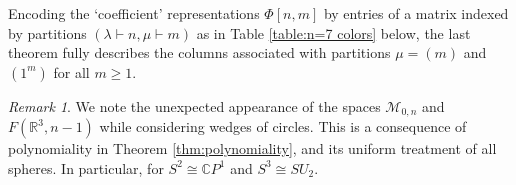 \documentclass[12pt]{article}
\newcommand{\R}{\mathbb{R}}
\newcommand{\ModuliCurve}[1]{\mathcal{M}_{#1}}
\DeclareMathOperator{\Out}{Out}
\theoremstyle{plain}
\theoremstyle{definition}
\theoremstyle{remark}
\newtheorem{rmk}[thm]{Remark}
\begin{document}
Encoding the `coefficient' representations $\Phi[n,m]$ by entries of a matrix indexed by partitions $(\lambda\vdash n, \mu \vdash m)$ as in Table \ref{table:n=7 colors} below, the last theorem fully describes the columns associated with partitions $\mu = (m)$ and $(1^m)$ for all $m\geq 1$.

\begin{rmk}
    We note the unexpected appearance of the spaces $\ModuliCurve{0,n}$ and $F(\R^3,n-1)$ while considering wedges of circles. This is a consequence of polynomiality in Theorem \ref{thm:polynomiality}, and its uniform treatment of all spheres. In particular, for $S^2 \cong \mathbb{C}P^1$ and $S^3 \cong SU_2$.
\end{rmk}

\end{document}
